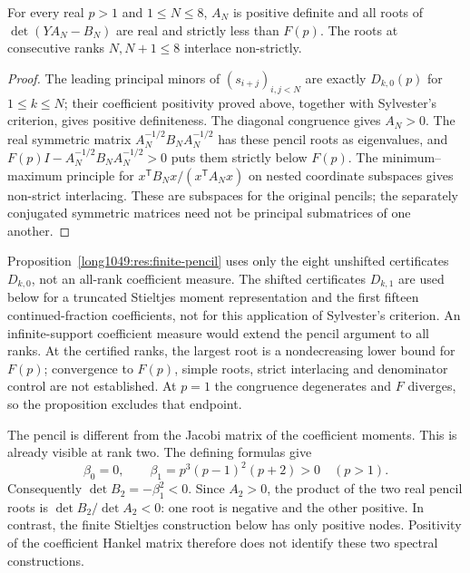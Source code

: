 \documentclass[11pt]{article}
\begin{document}
\begin{proposition}
\label{long1049:res:finite-pencil}
For every real $p>1$ and $1\le N\le8$, $A_N$ is positive definite and
all roots of $\det(YA_N-B_N)$ are real and strictly less than $F(p)$.
The roots at consecutive ranks $N,N+1\le8$ interlace non-strictly.
\end{proposition}
\begin{proof}
The leading principal minors of $(s_{i+j})_{i,j<N}$ are exactly
$D_{k,0}(p)$ for $1\le k\le N$; their coefficient positivity proved above, together with
Sylvester's criterion, gives positive definiteness. The diagonal congruence gives
$A_N>0$. The real symmetric matrix $A_N^{-1/2}B_NA_N^{-1/2}$ has these
pencil roots as eigenvalues, and $F(p)I-A_N^{-1/2}B_NA_N^{-1/2}>0$ puts
them strictly below $F(p)$. The minimum--maximum principle for
$x^{\mathsf T}B_Nx/(x^{\mathsf T}A_Nx)$ on nested coordinate subspaces
gives non-strict interlacing. These are subspaces for the original
pencils; the separately conjugated symmetric matrices need not be
principal submatrices of one another.
\end{proof}
Proposition~\ref{long1049:res:finite-pencil} uses only the eight
unshifted certificates $D_{k,0}$, not an all-rank coefficient measure.
The shifted certificates $D_{k,1}$ are used below for a truncated
Stieltjes moment representation and the first fifteen continued-fraction
coefficients, not for this application of Sylvester's criterion.
An infinite-support coefficient measure would extend the pencil argument
to all ranks. At the certified ranks, the largest root is a nondecreasing
lower bound for $F(p)$; convergence to $F(p)$, simple roots, strict
interlacing and denominator control are not established. At $p=1$ the
congruence degenerates and $F$ diverges, so the proposition excludes that
endpoint.

The pencil is different from the Jacobi matrix of the coefficient
moments. This is already visible at rank two. The defining formulas give
\[
 \beta_0=0,\qquad \beta_1=p^3(p-1)^2(p+2)>0\quad(p>1).
\]
Consequently $\det B_2=-\beta_1^2<0$. Since $A_2>0$, the product of the
two real pencil roots is $\det B_2/\det A_2<0$: one root is negative
and the other positive. In contrast, the finite Stieltjes construction
below has only positive nodes. Positivity of the coefficient Hankel
matrix therefore does not identify these two spectral constructions.
\end{document}
